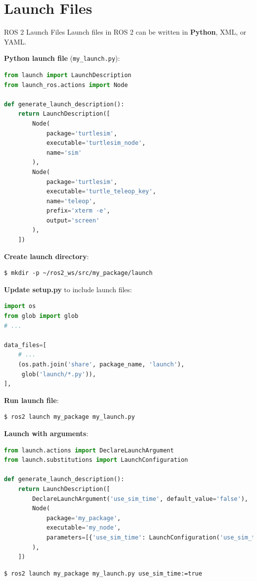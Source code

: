 \section{Launch Files}

\begin{frame}{ROS 2 Launch Files}
    Launch files in ROS 2 can be written in \textbf{Python}, XML, or YAML.

    \textbf{Python launch file} (\texttt{my\_launch.py}):
    \begin{lstlisting}[language=python]
from launch import LaunchDescription
from launch_ros.actions import Node

def generate_launch_description():
    return LaunchDescription([
        Node(
            package='turtlesim',
            executable='turtlesim_node',
            name='sim'
        ),
        Node(
            package='turtlesim',
            executable='turtle_teleop_key',
            name='teleop',
            prefix='xterm -e',
            output='screen'
        ),
    ])
\end{lstlisting}

    \framebreak

    \textbf{Create launch directory}:
    \begin{lstlisting}[language=shell]
$ mkdir -p ~/ros2_ws/src/my_package/launch
\end{lstlisting}

    \textbf{Update setup.py} to include launch files:
    \begin{lstlisting}[language=python]
import os
from glob import glob
# ...

data_files=[
    # ...
    (os.path.join('share', package_name, 'launch'), 
     glob('launch/*.py')),
],
\end{lstlisting}

    \framebreak

    \textbf{Run launch file}:
    \begin{lstlisting}[language=shell]
$ ros2 launch my_package my_launch.py
\end{lstlisting}

    \textbf{Launch with arguments}:
    \begin{lstlisting}[language=python]
from launch.actions import DeclareLaunchArgument
from launch.substitutions import LaunchConfiguration

def generate_launch_description():
    return LaunchDescription([
        DeclareLaunchArgument('use_sim_time', default_value='false'),
        Node(
            package='my_package',
            executable='my_node',
            parameters=[{'use_sim_time': LaunchConfiguration('use_sim_time')}]
        ),
    ])
\end{lstlisting}

    \begin{lstlisting}[language=shell]
$ ros2 launch my_package my_launch.py use_sim_time:=true
\end{lstlisting}
\end{frame}

